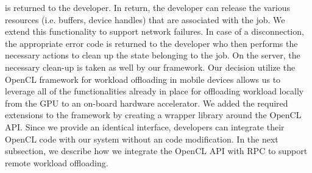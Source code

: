 \documentclass[conference]{IEEEtran}
\begin{document}
is returned to the developer.
%
In return, the developer can release the various resources (i.e.
buffers, device handles) that are associated with the job.
%
We extend this functionality to support network failures.
%
In case of a disconnection, the appropriate error code is returned to
the developer who then performs the necessary actions to clean up the
state belonging to the job.
%
On the server, the necessary clean-up is taken as well by our framework.
%
Our decision utilize the OpenCL framework for workload offloading in
mobile devices allows us to leverage all of the functionalities already
in place for offloading workload locally from the GPU to an on-board
hardware accelerator.
%
We added the required extensions to the framework by creating a wrapper
library around the OpenCL API.
%
Since we provide an identical interface, developers can integrate their
OpenCL code with our system without an code modification.
%
In the next subsection, we describe how we integrate the OpenCL API with
RPC to support remote workload offloading.
%
\end{document}
